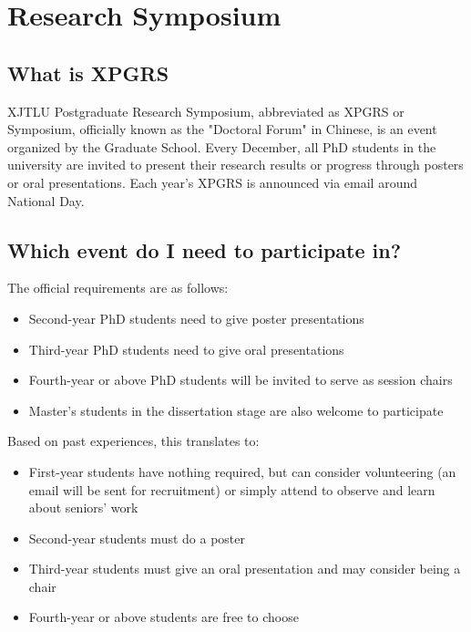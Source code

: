 \section{Research Symposium}

\subsection{What is XPGRS}
XJTLU Postgraduate Research Symposium, abbreviated as XPGRS or Symposium, officially known as the "Doctoral Forum" in Chinese, is an event organized by the Graduate School. Every December, all PhD students in the university are invited to present their research results or progress through posters or oral presentations. Each year's XPGRS is announced via email around National Day.

\subsection{Which event do I need to participate in?}

The official requirements are as follows:

\begin{itemize}
    \item Second-year PhD students need to give poster presentations
    \item Third-year PhD students need to give oral presentations
    \item Fourth-year or above PhD students will be invited to serve as session chairs
    \item Master's students in the dissertation stage are also welcome to participate
\end{itemize}

Based on past experiences, this translates to:

\begin{itemize}
    \item First-year students have nothing required, but can consider volunteering (an email will be sent for recruitment) or simply attend to observe and learn about seniors' work
    \item Second-year students must do a poster
    \item Third-year students must give an oral presentation and may consider being a chair
    \item Fourth-year or above students are free to choose
\end{itemize}

